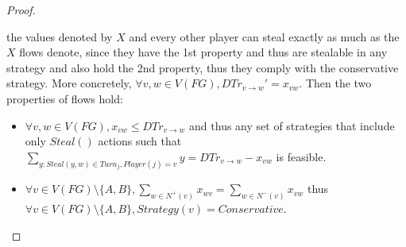 \documentclass[11pt]{article}
\theoremstyle{definition}
\theoremstyle{corollary}
\theoremstyle{lemma}
\begin{document}
\begin{proof}
\begin{itemize}
          the values denoted by $X$ and every other player can steal exactly as much as the $X$ flows denote, since they
          have the 1st property and thus are stealable in any strategy and also hold the 2nd property, thus they comply with
          the conservative strategy. More concretely, $\forall v,w \in V(FG), DTr_{v \rightarrow w}' = x_{vw}$. Then the two
          properties of flows hold:
          \begin{itemize}
             \item $\forall v,w \in V(FG),x_{vw} \leq DTr_{v \rightarrow w}$ and thus any set of strategies that include only
             $Steal()$ actions such that $\sum\limits_{y : Steal(y,w) \in Turn_j, Player(j) = v}y = DTr_{v \rightarrow w} -
             x_{vw}$ is feasible.
             \item $\forall v \in V(FG) \setminus \{A,B\}, \sum\limits_{w \in N^{+}(v)}x_{wv} =
             \sum\limits_{w \in N^{-}(v)}x_{vw}$ thus $\forall v \in V(FG) \setminus \{A,B\}, Strategy(v) = Conservative$.
          \end{itemize}
             

\end{itemize}
\end{proof}
\end{document}
